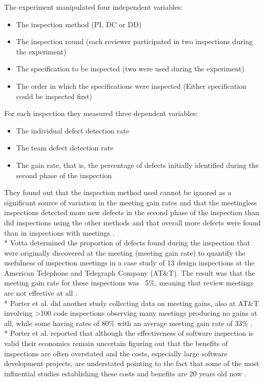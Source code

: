 The experiment manipulated four independent variables:
\begin{itemize}
	\item The inspection method (PI, DC or DD)
	\item The inspection round (each reviewer participated in two inspections during the experiment)
	\item The specification to be inspected (two were used during the experiment)
	\item The order in which the specifications were inspected (Either specification could be inspected first)
\end{itemize}
For each inspection they measured three dependent variables:
\begin{itemize}
	\item The individual defect detection rate
	\item The team defect detection rate
	\item The gain rate, that is, the percentage of defects initially identified during the second phase of the inspection
\end{itemize}
They found out that the inspection method used cannot be ignored as a significant source of variation in the meeting gain rates and that the meetingless inspections detected more new defects in the second phase of the inspection than did inspections using the other methods and that overall more defects were found than in inspections with meetings \cite{mccarthy1996experiment}. \\*
Votta determined the proportion of defects found during the inspection that were originally discovered at the meeting (meeting gain rate) to quantify the usefulness of inspection meetings in a case study of 13 design inspections at the American Telephone and Telegraph Company (AT\&T). The result was that the meeting gain rate for these inspections was ~5\%, meaning that review meetings are not effective at all \cite{votta1993does}. \\*
Porter et al. did another study collecting data on meeting gains, also at AT\&T involving >100 code inspections observing many meetings producing no gains at all, while some having rates of 80\% with an average meeting gain rate of 33\% \cite{porter1995experiment}. \\*
Porter et al. reported that although the effectiveness of software inspection is valid their economics remain uncertain figuring out that the benefits of inspections are often overstated and the costs, especially large software development projects, are understated pointing to the fact that some of the most influential studies establishing these costs and benefits are 20 years old now \cite{porter1996review}.
